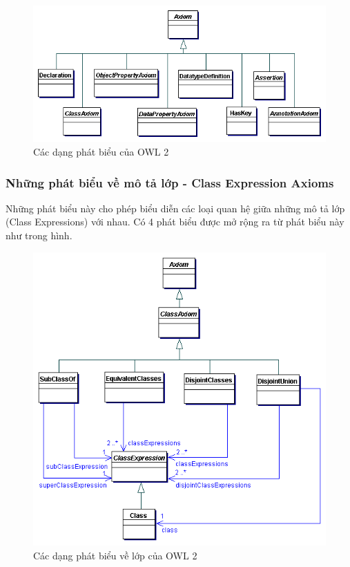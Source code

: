 \begin{figure}[!h]
	\centering
	\includegraphics[width=150mm]{Figures/axioms.png}
	\caption{Các dạng phát biểu của OWL 2\label{overflow}}
\end{figure}

\subsubsection{Những phát biểu về mô tả lớp - Class Expression Axioms}
Những phát biểu này cho phép biểu diễn các loại quan hệ giữa những mô tả lớp (Class Expressions) với nhau. Có 4 phát biểu được mở rộng ra từ phát biểu này như trong hình.
\begin{figure}[!h]
	\centering
	\includegraphics[width=120mm]{Figures/classAxiom.png}
	\caption{Các dạng phát biểu về lớp của OWL 2\label{overflow}}
\end{figure}

